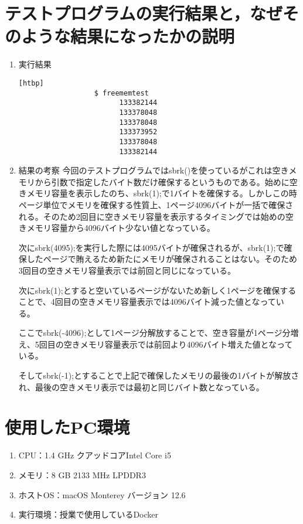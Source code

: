 \documentclass[a4j,12pt]{jreport}
\begin{document}
\section{テストプログラムの実行結果と，なぜそのような結果になったかの説明}
\begin{enumerate}
      \item 実行結果
            \begin{lstlisting}[basicstyle=\ttfamily\footnotesize, firstnumber=0][htbp]
                  $ freememtest
                        133382144
                        133378048
                        133378048
                        133373952
                        133378048
                        133382144
            \end{lstlisting}

      \item 結果の考察
            今回のテストプログラムではsbrk()を使っているがこれは空きメモリから引数で指定したバイト数だけ確保するというものである。始めに空きメモリ容量を表示したのち、sbrk(1);で1バイトを確保する。しかしこの時ページ単位でメモリを確保する性質上、1ページ4096バイトが一括で確保される。そのため2回目に空きメモリ容量を表示するタイミングでは始めの空きメモリ容量から4096バイト少ない値となっている。

            次にsbrk(4095);を実行した際には4095バイトが確保されるが、sbrk(1);で確保したページで賄えるため新たにメモリが確保されることはない。そのため3回目の空きメモリ容量表示では前回と同じになっている。

            次にsbrk(1);とすると空いているページがないため新しく1ページを確保することで、4回目の空きメモリ容量表示では4096バイト減った値となっている。

            ここでsbrk(-4096);として1ページ分解放することで、空き容量が1ページ分増え、5回目の空きメモリ容量表示では前回より4096バイト増えた値となっている。

            そしてsbrk(-1);とすることで上記で確保したメモリの最後の1バイトが解放され、最後の空きメモリ表示では最初と同じバイト数となっている。
\end{enumerate}


\section{使用したPC環境}
\begin{enumerate}
      \item CPU：1.4 GHz クアッドコアIntel Core i5
      \item メモリ：8 GB 2133 MHz LPDDR3
      \item ホストOS：macOS Monterey バージョン 12.6
      \item 実行環境：授業で使用しているDocker
\end{enumerate}
\end{document}
